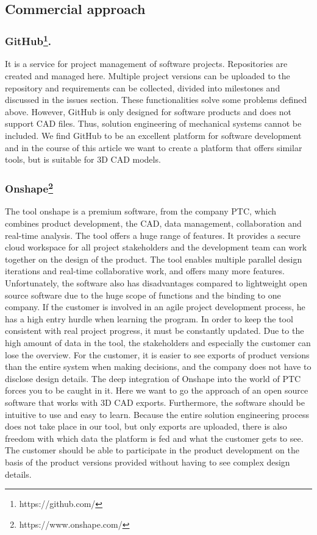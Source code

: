     \subsection*{Commercial approach}
    \subsubsection*{GitHub\footnote{https://github.com/}.}
    It is a service for project management of software projects. Repositories are created and managed here. Multiple project versions can be uploaded to the repository and requirements can be collected, divided into milestones and discussed in the issues section. These functionalities solve some problems defined above. However, GitHub is only designed for software products and does not support CAD files. Thus, solution engineering of mechanical systems cannot be included. We find GitHub to be an excellent platform for software development and in the course of this article we want to create a platform that offers similar tools, but is suitable for 3D CAD models.

    \subsubsection*{Onshape\footnote{https://www.onshape.com/}}
    The tool onshape is a premium software, from the company PTC, which combines product development, the CAD, data management, collaboration and real-time analysis. The tool offers a huge range of features. It provides a secure cloud workspace for all project stakeholders and the development team can work together on the design of the product. The tool enables multiple parallel design iterations and real-time collaborative work, and offers many more features. 
    Unfortunately, the software also has disadvantages compared to lightweight open source software due to the huge scope of functions and the binding to one company. If the customer is involved in an agile project development process, he has a high entry hurdle when learning the program.  In order to keep the tool consistent with real project progress, it must be constantly updated. Due to the high amount of data in the tool, the stakeholders and especially the customer can lose the overview. For the customer, it is easier to see exports of product versions than the entire system when making decisions, and the company does not have to disclose design details. The deep integration of Onshape into the world of PTC forces you to be caught in it. 
    Here we want to go the approach of an open source software that works with 3D CAD exports. Furthermore, the software should be intuitive to use and easy to learn. Because the entire solution engineering process does not take place in our tool, but only exports are uploaded, there is also freedom with which data the platform is fed and what the customer gets to see. The customer should be able to participate in the product development on the basis of the product versions provided without having to see complex design details.

